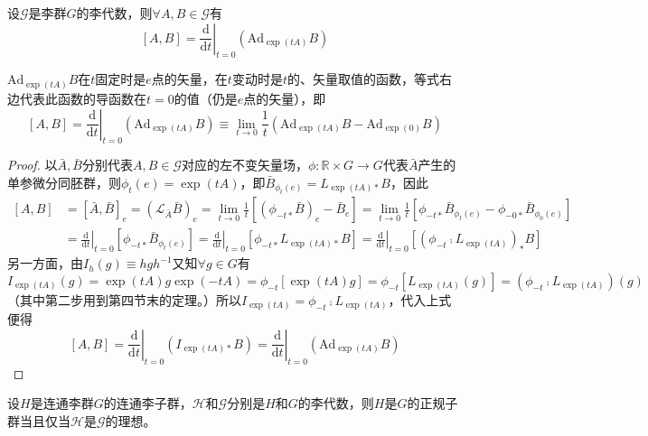 \begin{theorem}
    设$\mathscr{G}$是李群$G$的李代数，则$\forall A, B \in \mathscr{G}$有
    $$[A, B] = \left.\frac{\mathrm{d}}{\mathrm{d}t}\right|_{t = 0}(\mathrm{Ad}_{\exp(tA)}B)$$
\end{theorem}

\begin{note}
    $\mathrm{Ad}_{\exp(tA)}B$在$t$固定时是$e$点的矢量，在$t$变动时是$t$的、矢量取值的函数，等式右边代表此函数的导函数在$t = 0$的值（仍是$e$点的矢量），即
    $$[A, B] = \left.\frac{\mathrm{d}}{\mathrm{d}t}\right|_{t = 0}(\mathrm{Ad}_{\exp(tA)}B) \equiv \lim_{t \to 0}\frac{1}{t}(\mathrm{Ad}_{\exp(tA)}B - \mathrm{Ad}_{\exp(0)}B)$$
\end{note}

\begin{proof}
    以$\bar A, \bar B$分别代表$A, B \in \mathscr{G}$对应的左不变矢量场，$\phi \colon \mathbb{R} \times G \to G$代表$\bar A$产生的单参微分同胚群，则$\phi_t(e) = \exp(tA)$，即$\bar B_{\phi_t(e)} = L_{\exp(tA)*}B$，因此
    \[\begin{split}
        [A, B] & = [\bar A, \bar B]_e = (\mathscr{L}_{\bar A}\bar B)_e = \lim_{t \to 0}\frac{1}{t}[(\phi_{-t*}\bar B)_e - \bar B_e] = \lim_{t \to 0}\frac{1}{t}[\phi_{-t*}\bar B_{\phi_t(e)} - \phi_{-0*}\bar B_{\phi_0(e)}] \\
        & = \left.\frac{\mathrm{d}}{\mathrm{d}t}\right|_{t = 0}[\phi_{-t*}\bar B_{\phi_t(e)}] = \left.\frac{\mathrm{d}}{\mathrm{d}t}\right|_{t = 0}[\phi_{-t*}L_{\exp(tA)*}B] = \left.\frac{\mathrm{d}}{\mathrm{d}t}\right|_{t = 0}[(\phi_{-t} \comp L_{\exp(tA)})_*B]
    \end{split}\]
    另一方面，由$I_h(g) \equiv hgh^{-1}$又知$\forall g \in G$有
    $$I_{\exp(tA)}(g) = \exp(tA)g\exp(-tA) = \phi_{-t}[\exp(tA)g] = \phi_{-t}[L_{\exp(tA)}(g)] = (\phi_{-t} \comp L_{\exp(tA)})(g)$$
    （其中第二步用到第四节末的定理。）所以$I_{\exp(tA)} = \phi_{-t}\comp L_{\exp(tA)}$，代入上式便得
    $$[A, B] = \left.\frac{\mathrm{d}}{\mathrm{d}t}\right|_{t = 0}(I_{\exp(tA)*}B) = \left.\frac{\mathrm{d}}{\mathrm{d}t}\right|_{t = 0}(\mathrm{Ad}_{\exp(tA)}B)$$
\end{proof}

\begin{theorem}
    设$H$是连通李群$G$的连通李子群，$\mathscr{H}$和$\mathscr{G}$分别是$H$和$G$的李代数，则$H$是$G$的正规子群当且仅当$\mathscr{H}$是$\mathscr{G}$的理想。
\end{theorem}

